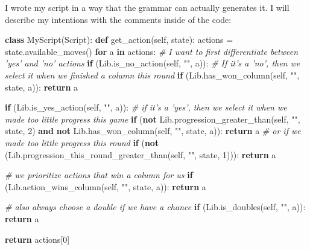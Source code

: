 \documentclass[]{article}
\newenvironment{Shaded}{}{}
\newcommand{\KeywordTok}[1]{\textcolor[rgb]{0.00,0.44,0.13}{\textbf{#1}}}
\newcommand{\DecValTok}[1]{\textcolor[rgb]{0.25,0.63,0.44}{#1}}
\newcommand{\StringTok}[1]{\textcolor[rgb]{0.25,0.44,0.63}{#1}}
\newcommand{\CommentTok}[1]{\textcolor[rgb]{0.38,0.63,0.69}{\textit{#1}}}
\newcommand{\VariableTok}[1]{\textcolor[rgb]{0.10,0.09,0.49}{#1}}
\newcommand{\ControlFlowTok}[1]{\textcolor[rgb]{0.00,0.44,0.13}{\textbf{#1}}}
\newcommand{\OperatorTok}[1]{\textcolor[rgb]{0.40,0.40,0.40}{#1}}
\newcommand{\NormalTok}[1]{#1}
\begin{document}
I wrote my script in a way that the grammar can actually generates it. I
will describe my intentions with the comments inside of the code:

\begin{Shaded}
\begin{Highlighting}[]
\KeywordTok{class}\NormalTok{ MyScript(Script):}
    \KeywordTok{def}\NormalTok{ get_action(}\VariableTok{self}\NormalTok{, state):}
\NormalTok{        actions }\OperatorTok{=}\NormalTok{ state.available_moves()}
        \ControlFlowTok{for}\NormalTok{ a }\KeywordTok{in}\NormalTok{ actions:}
            \CommentTok{# I want to first differentiate between 'yes' and 'no' actions}
            \ControlFlowTok{if}\NormalTok{ (Lib.is_no_action(}\VariableTok{self}\NormalTok{, }\StringTok{""}\NormalTok{, a)):}
                \CommentTok{# If it's a 'no', then we select it when we finished a column this round}
                \ControlFlowTok{if}\NormalTok{ (Lib.has_won_column(}\VariableTok{self}\NormalTok{, }\StringTok{""}\NormalTok{, state, a)):}
                    \ControlFlowTok{return}\NormalTok{ a}
                
            \ControlFlowTok{if}\NormalTok{ (Lib.is_yes_action(}\VariableTok{self}\NormalTok{, }\StringTok{""}\NormalTok{, a)):}
                \CommentTok{# if it's a 'yes', then we select it when we made too little progress this game}
                \ControlFlowTok{if}\NormalTok{ (}\KeywordTok{not}\NormalTok{ Lib.progression_greater_than(}\VariableTok{self}\NormalTok{, }\StringTok{""}\NormalTok{, state, }\DecValTok{2}\NormalTok{)}
                   \KeywordTok{and} \KeywordTok{not}\NormalTok{ Lib.has_won_column(}\VariableTok{self}\NormalTok{, }\StringTok{""}\NormalTok{, state, a)):}
                    \ControlFlowTok{return}\NormalTok{ a}
                \CommentTok{# or if we made too little progress this round}
                \ControlFlowTok{if}\NormalTok{ (}\KeywordTok{not}\NormalTok{ (Lib.progression_this_round_greater_than(}\VariableTok{self}\NormalTok{, }\StringTok{""}\NormalTok{, state, }\DecValTok{1}\NormalTok{))):}
                    \ControlFlowTok{return}\NormalTok{ a}

            \CommentTok{# we prioritize actions that win a column for us}
            \ControlFlowTok{if}\NormalTok{ (Lib.action_wins_column(}\VariableTok{self}\NormalTok{, }\StringTok{""}\NormalTok{, state, a)):}
                \ControlFlowTok{return}\NormalTok{ a}
                
            \CommentTok{# also always choose a double if we have a chance}
            \ControlFlowTok{if}\NormalTok{ (Lib.is_doubles(}\VariableTok{self}\NormalTok{, }\StringTok{""}\NormalTok{, a)):}
                \ControlFlowTok{return}\NormalTok{ a}
               
        \ControlFlowTok{return}\NormalTok{ actions[}\DecValTok{0}\NormalTok{]}
\end{Highlighting}
\end{Shaded}
\end{document}
